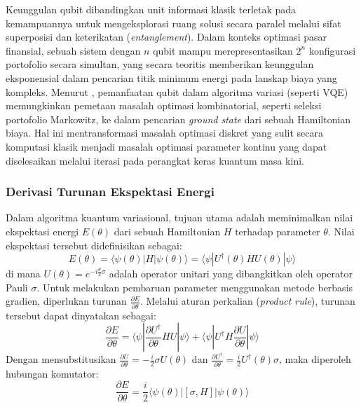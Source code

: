 Keunggulan qubit dibandingkan unit informasi klasik terletak pada kemampuannya untuk mengeksplorasi ruang solusi secara paralel melalui sifat superposisi dan keterikatan (\textit{entanglement}). Dalam konteks optimasi pasar finansial, sebuah sistem dengan $n$ qubit mampu merepresentasikan $2^n$ konfigurasi portofolio secara simultan, yang secara teoritis memberikan keunggulan eksponensial dalam pencarian titik minimum energi pada lanskap biaya yang kompleks. Menurut \cite{preskill_2018}, pemanfaatan qubit dalam algoritma variasi (seperti VQE) memungkinkan pemetaan masalah optimasi kombinatorial, seperti seleksi portofolio Markowitz, ke dalam pencarian \textit{ground state} dari sebuah Hamiltonian biaya. Hal ini mentransformasi masalah optimasi diskret yang sulit secara komputasi klasik menjadi masalah optimasi parameter kontinu yang dapat diselesaikan melalui iterasi pada perangkat keras kuantum masa kini.

\subsubsection{Derivasi Turunan Ekspektasi Energi}

Dalam algoritma kuantum variasional, tujuan utama adalah meminimalkan nilai ekspektasi energi $E(\theta)$ dari sebuah Hamiltonian $H$ terhadap parameter $\theta$. Nilai ekspektasi tersebut didefinisikan sebagai:
\begin{equation}
    E(\theta) = \langle \psi(\theta) | H | \psi(\theta) \rangle = \langle \psi | U^\dagger(\theta) H U(\theta) | \psi \rangle
\end{equation}
di mana $U(\theta) = e^{-i\frac{\theta}{2}\sigma}$ adalah operator unitari yang dibangkitkan oleh operator Pauli $\sigma$. Untuk melakukan pembaruan parameter menggunakan metode berbasis gradien, diperlukan turunan $\frac{\partial E}{\partial \theta}$. Melalui aturan perkalian (\textit{product rule}), turunan tersebut dapat dinyatakan sebagai:
\begin{equation}
    \frac{\partial E}{\partial \theta} = \langle \psi | \frac{\partial U^\dagger}{\partial \theta} H U | \psi \rangle + \langle \psi | U^\dagger H \frac{\partial U}{\partial \theta} | \psi \rangle
\end{equation}
Dengan mensubstitusikan $\frac{\partial U}{\partial \theta} = -\frac{i}{2}\sigma U(\theta)$ dan $\frac{\partial U^\dagger}{\partial \theta} = \frac{i}{2} U^\dagger(\theta) \sigma$, maka diperoleh hubungan komutator:
\begin{equation}
    \frac{\partial E}{\partial \theta} = \frac{i}{2} \langle \psi(\theta) | [\sigma, H] | \psi(\theta) \rangle
\end{equation}

